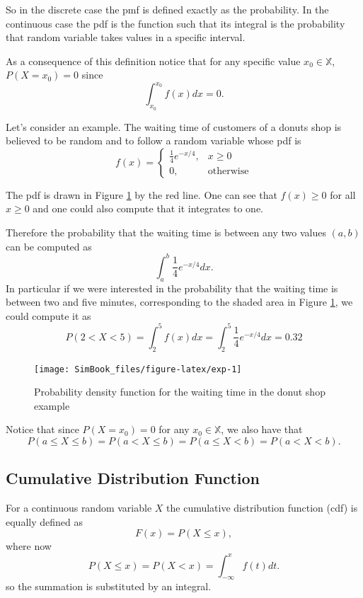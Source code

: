 \documentclass[
]{book}
\begin{document}
So in the discrete case the pmf is defined exactly as the probability. In the continuous case the pdf is the function such that its integral is the probability that random variable takes values in a specific interval.

As a consequence of this definition notice that for any specific value \(x_0\in\mathbb{X}\), \(P(X=x_0)=0\) since
\[
\int_{x_0}^{x_0}f(x)dx = 0.
\]

Let's consider an example. The waiting time of customers of a donuts shop is believed to be random and to follow a random variable whose pdf is
\[
f(x) = \left\{
\begin{array}{ll}
\frac{1}{4}e^{-x/4}, & x\geq 0\\
0, & \mbox{otherwise}
\end{array}
\right.
\]

The pdf is drawn in Figure \ref{fig:exp} by the red line. One can see that \(f(x)\geq 0\) for all \(x\geq 0\) and one could also compute that it integrates to one.

Therefore the probability that the waiting time is between any two values \((a,b)\) can be computed as
\[
\int_a^b\frac{1}{4}e^{-x/4}dx.
\]
In particular if we were interested in the probability that the waiting time is between two and five minutes, corresponding to the shaded area in Figure \ref{fig:exp}, we could compute it as
\[
P(2<X<5)=\int_2^5f(x)dx=\int_{2}^5\frac{1}{4}e^{-x/4}dx= 0.32
\]

\begin{figure}

{\centering \texttt{[image: SimBook\_files/figure-latex/exp-1]} 

}

\caption{Probability density function for the waiting time in the donut shop example}\label{fig:exp}
\end{figure}

Notice that since \(P(X=x_0)=0\) for any \(x_0\in\mathbb{X}\), we also have that
\[
P(a\leq X \leq b)=P(a < X \leq b) = P(a\leq X < b) = P(a<X<b).
\]

\hypertarget{cumulative-distribution-function-1}{%
\subsection{Cumulative Distribution Function}\label{cumulative-distribution-function-1}}

For a continuous random variable \(X\) the cumulative distribution function (cdf) is equally defined as
\[
F(x) = P(X \leq x),
\]
where now
\[
P(X \leq x) = P(X < x) = \int_{-\infty}^xf(t)dt.
\]
so the summation is substituted by an integral.
\end{document}
